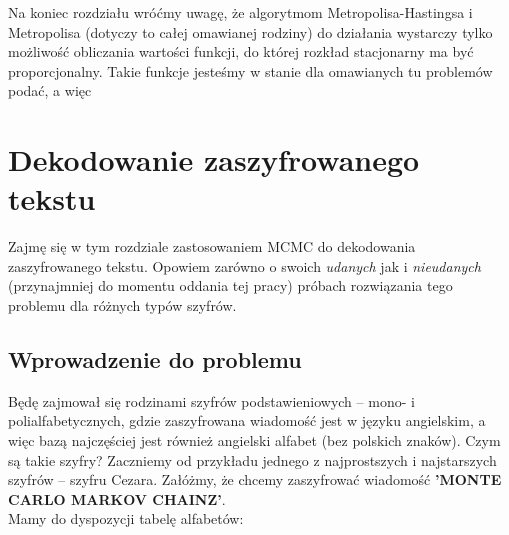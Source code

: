 \documentclass[a4paper]{article}
\theoremstyle{defn}
\theoremstyle{theorem}
\theoremstyle{lemma}
\theoremstyle{cor}
\theoremstyle{fact}
\begin{document}
Na koniec rozdziału wróćmy uwagę, że algorytmom Metropolisa-Hastingsa i Metropolisa (dotyczy to całej omawianej rodziny) do działania wystarczy tylko możliwość obliczania wartości funkcji, do której rozkład stacjonarny ma być proporcjonalny. Takie funkcje jesteśmy w stanie dla omawianych tu problemów podać, a więc
\newpage

\section{Dekodowanie zaszyfrowanego tekstu}
Zajmę się w tym rozdziale zastosowaniem MCMC do dekodowania zaszyfrowanego tekstu. Opowiem zarówno o swoich \textit{udanych} jak i \textit{nieudanych} (przynajmniej do momentu oddania tej pracy) próbach rozwiązania tego problemu dla różnych typów szyfrów.
\subsection{Wprowadzenie do problemu}
Będę zajmował się rodzinami szyfrów podstawieniowych – mono- i polialfabetycznych, gdzie zaszyfrowana wiadomość jest w języku angielskim, a więc bazą najczęściej jest również angielski alfabet (bez polskich znaków). Czym są takie szyfry? Zaczniemy od przykładu jednego z najprostszych i najstarszych szyfrów – szyfru Cezara. Załóżmy, że chcemy zaszyfrować wiadomość \textbf{'MONTE CARLO MARKOV CHAINZ'}.\\
Mamy do dyspozycji tabelę alfabetów:\\
\end{document}
